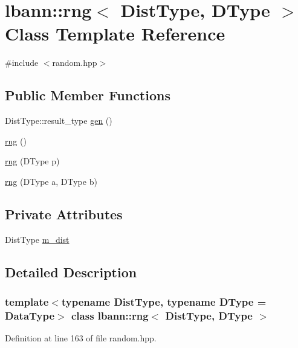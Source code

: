 \hypertarget{classlbann_1_1rng}{}\section{lbann\+:\+:rng$<$ Dist\+Type, D\+Type $>$ Class Template Reference}
\label{classlbann_1_1rng}


{\ttfamily \#include $<$random.\+hpp$>$}

\subsection*{Public Member Functions}
\begin{DoxyCompactItemize}
\item 
Dist\+Type\+::result\+\_\+type \hyperlink{classlbann_1_1rng_a1c8a2640dd522c6fc63bf2de09ff3e84}{gen} ()
\item 
\hyperlink{classlbann_1_1rng_a7f510fb55d7f261efb4ba86ed623509a}{rng} ()
\item 
\hyperlink{classlbann_1_1rng_aedb81fe65719eb1864f8f891d48772b1}{rng} (D\+Type p)
\item 
\hyperlink{classlbann_1_1rng_aede986b92f5d075b4881f8cca86459dd}{rng} (D\+Type a, D\+Type b)
\end{DoxyCompactItemize}
\subsection*{Private Attributes}
\begin{DoxyCompactItemize}
\item 
Dist\+Type \hyperlink{classlbann_1_1rng_a07a437f5344e29d6cf557e95ae83a24c}{m\+\_\+dist}
\end{DoxyCompactItemize}


\subsection{Detailed Description}
\subsubsection*{template$<$typename Dist\+Type, typename D\+Type = Data\+Type$>$\newline
class lbann\+::rng$<$ Dist\+Type, D\+Type $>$}



Definition at line 163 of file random.\+hpp.



